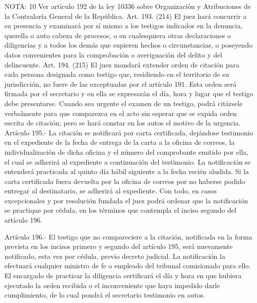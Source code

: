 NOTA:  10
    Ver artículo 192 de la ley 10336 sobre Organización y Atribuciones de la Contraloría General de la República.
    Art. 193. (214) El juez hará concurrir a su presencia y examinará por sí mismo a los testigos indicados en la denuncia, querella o auto cabeza de procesos, o en cualesquiera otras declaraciones o diligencias y a todos los demás que supieren hechos o circunstancias, o poseyendo datos convenientes para la comprobación o averiguación del delito y del delincuente.
    Art. 194. (215) El juez mandará extender orden de citación para cada persona designada como testigo que, residiendo en el territorio de su jurisdicción, no fuere de las exceptuadas por el artículo 191.
    Esta orden será firmada por el secretario y en ella se expresarán el día, hora y lugar que el testigo debe presentarse.
    Cuando sea urgente el examen de un testigo, podrá citársele verbalmente para que comparezca en el acto sin esperar que se expida orden escrita de citación; pero se hará constar en los autos el motivo de la urgencia.
    Artículo 195.- La citación se notificará por carta certificada, dejándose testimonio en el expediente de la fecha de entrega de la carta a la oficina de correos, la individualización de dicha oficina y el número del comprobante emitido por ella, el cual se adherirá al expediente a continuación del testimonio.
    La notificación se entenderá practicada al quinto día hábil siguiente a la fecha recién aludida. Si la carta certificada fuera devuelta por la oficina de correos por no haberse podido entregar al destinatario, se adherirá al expediente.
    Con todo, en casos excepcionales y por resolución fundada el juez podrá ordenar que la notificación se practique por cédula, en los términos que contempla el inciso segundo del artículo 196.

    Artículo 196.- El testigo que no compareciere a la citación, notificada en la forma prevista en los incisos primero y segundo del artículo 195, será nuevamente notificado, esta vez por cédula, previo decreto judicial.
    La notificación la efectuará cualquier ministro de fe o empleado del tribunal comisionado para ello. El encargado de practicar la diligencia certificará el día y hora en que hubiera ejecutado la orden recibida o el inconveniente que haya impedido darle cumplimiento, de lo cual pondrá el secretario testimonio en autos.

